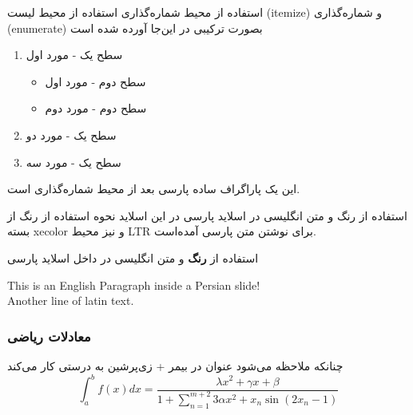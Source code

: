 \documentclass{beamer}
\makeatletter
\newcommand{ \RTList}{\raggedleft\rightskip\@totalleftmargin}
\makeatother
\begin{document}
\begin{persian}
\begin{frame}{استفاده از محیط شماره‌گذاری}
 استفاده از محیط لیست (itemize) و شماره‌گذاری (enumerate) بصورت ترکیبی در این‌جا آورده شده است
 \begin{enumerate}\RTList
      \item سطح یک - مورد اول
	      \begin{itemize}\RTList
	      		\item  سطح دوم - مورد اول
	     		 \item  سطح دوم - مورد دوم
	      \end{itemize}
      \item سطح یک - مورد دو
      \item سطح یک - مورد سه
 \end{enumerate}

این یک پاراگراف ساده پارسی بعد از محیط شماره‌گذاری است.
\end{frame}


\begin{frame}{استفاده از رنگ و متن انگلیسی در اسلاید پارسی}
در این اسلاید نحوه استفاده از رنگ از بسته xecolor و نیز محیط LTR برای نوشتن متن پارسی آمده‌است.
\vspace{1cm}

{
	استفاده از \textbf{رنگ} و متن انگلیسی در داخل اسلاید پارسی
}
\vspace{1cm}
{
	\begin{LTR}
		This is an English Paragraph inside a Persian slide!\\
		Another line of latin text.
	\end{LTR}
}

\end{frame}


\begin{frame}
\frametitle{معادلات ریاضی}
چنانکه ملاحظه می‌شود عنوان در بیمر + زی‌پرشین به درستی کار می‌کند
\vspace{2cm}
\begin{equation}
\int_{a}^{b} f(x)dx = \frac{\lambda x^2 + \gamma x + \beta}{1+\sum_{n=1}^{m+2} 3 \alpha x^2 +x_n \sin(2 x_n -1)}
\end{equation}

\end{frame}


\end{persian}
\end{document}
